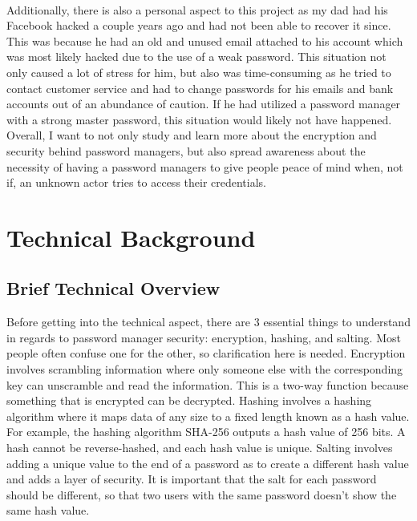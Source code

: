 \documentclass[10pt,twocolumn]{article}
\begin{document}
\paragraph{}
Additionally, there is also a personal aspect to this project as my dad had his Facebook hacked a couple years ago and had not been able to recover it since. This was because he had an old and unused email attached to his account which was most likely hacked due to the use of a weak password. This situation not only caused a lot of stress for him, but also was time-consuming as he tried to contact customer service and had to change passwords for his emails and bank accounts out of an abundance of caution. If he had utilized a password manager with a strong master password, this situation would likely not have happened. Overall, I want to not only study and learn more about the encryption and security behind password managers, but also spread awareness about the necessity of having a password managers to give people peace of mind when, not if, an unknown actor tries to access their credentials.


\section{Technical Background}


\subsection{Brief Technical Overview}
Before getting into the technical aspect, there are 3 essential things to understand in regards to password manager security: encryption, hashing, and salting. Most people often confuse one for the other, so clarification here is needed. Encryption involves scrambling information where only someone else with the corresponding key can unscramble and read the information. This is a two-way function because something that is encrypted can be decrypted. Hashing involves a hashing algorithm where it maps data of any  size to a fixed length known as a hash value. For example, the hashing algorithm SHA-256 outputs a hash value of 256 bits. A hash cannot be reverse-hashed, and each hash value is unique. Salting involves adding a unique value to the end of a password as to create a different hash value and adds a layer of security. It is important that the salt for each password should be different, so that two users with the same password doesn't show the same hash value.
\end{document}
